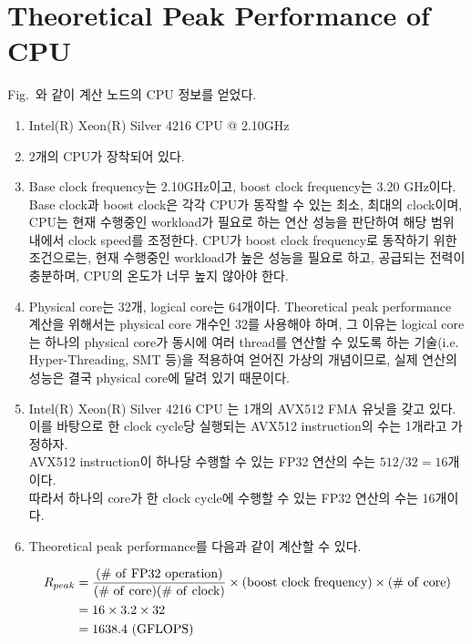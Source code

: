 \section{Theoretical Peak Performance of CPU}

Fig.~{}와 같이 계산 노드의 CPU 정보를 얻었다.

\begin{enumerate}[label= (\alph*)]

    \item {Intel(R) Xeon(R) Silver 4216 CPU @ 2.10GHz}
    \item {2개의 CPU가 장착되어 있다.}
    \item {
        Base clock frequency는 2.10GHz이고, boost clock frequency는 3.20 GHz이다.
        Base clock과 boost clock은 각각 CPU가 동작할 수 있는 최소, 최대의 clock이며,
        CPU는 현재 수행중인 workload가 필요로 하는 연산 성능을 판단하여 해당 범위 내에서 clock speed를 조정한다.
        CPU가 boost clock frequency로 동작하기 위한 조건으로는, 현재 수행중인 workload가 높은 성능을 필요로 하고,
        공급되는 전력이 충분하며, CPU의 온도가 너무 높지 않아야 한다.
    }
    \item {
        Physical core는 32개, logical core는 64개이다.
        Theoretical peak performance 계산을 위해서는 physical core 개수인 32를 사용해야 하며,
        그 이유는 logical core는 하나의 physical core가 동시에 여러 thread를 연산할 수 있도록 하는
        기술(i.e. Hyper-Threading, SMT 등)을 적용하여 얻어진 가상의 개념이므로,
        실제 연산의 성능은 결국 physical core에 달려 있기 때문이다.
    }
    \item {
        Intel(R) Xeon(R) Silver 4216 CPU 는 1개의 AVX512 FMA 유닛을 갖고 있다.
        이를 바탕으로 한 clock cycle당 실행되는 AVX512 instruction의 수는 1개라고 가정하자. \\
        AVX512 instruction이 하나당 수행할 수 있는 FP32 연산의 수는 $512/32=16$개이다. \\
        따라서 하나의 core가 한 clock cycle에 수행할 수 있는 FP32 연산의 수는 16개이다.
    }
    \item {
        Theoretical peak performance를 다음과 같이 계산할 수 있다.
        
        \begin{align}
            R_{peak}
            & =     \mathrm{\frac{(\#~of~FP32~operation)}{(\#~of~core)(\#~of~clock)}}
            \times  \mathrm{(boost~clock~frequency)}
            \times  \mathrm{(\#~of~core)} \notag \\
            & = 16 \times 3.2 \times 32 \notag \\
            & = {1638.4}~\mathrm{(GFLOPS)} \notag
        \end{align}
    
    }
    
\end{enumerate}